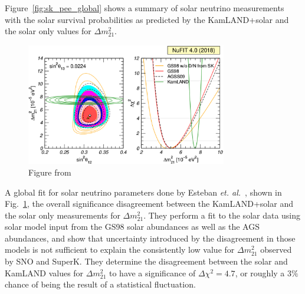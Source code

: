 Figure~\ref{fig:sk_pee_global} shows a summary of solar neutrino measurements
with the solar survival probabilities as predicted by the KamLAND+solar and
the solar only values for $\Delta m^{2}_{21}$.

\begin{figure}[htbp]
    \centering
    \includegraphics[width=0.78\textwidth]{nufit_dm21_tension}
    \caption[]{Figure from~\citep{nu_fit4}}
    \label{fig:nufit_dm21_tension}
\end{figure}
A global fit for solar neutrino parameters done by Esteban \textit{et. al.}~\citep{nu_fit4},
shown in Fig.~\ref{fig:nufit_dm21_tension},
the overall significance disagreement between the KamLAND+solar and the solar only
measurements for $\Delta m^{2}_{21}$.
They perform a fit to the solar data using solar model input from the GS98 solar abundances
as well as the AGS abundances, and show that uncertainty introduced by the
disagreement in those models is not sufficient to explain the consistently
low value for $\Delta m^{2}_{21}$ observed by SNO and SuperK.
They determine the disagreement between the solar and KamLAND values for
$\Delta m^{2}_{21}$ to have a significance of $\Delta \chi^{2} = 4.7$, or
roughly a $3\%$ chance of being the result of a statistical fluctuation.


